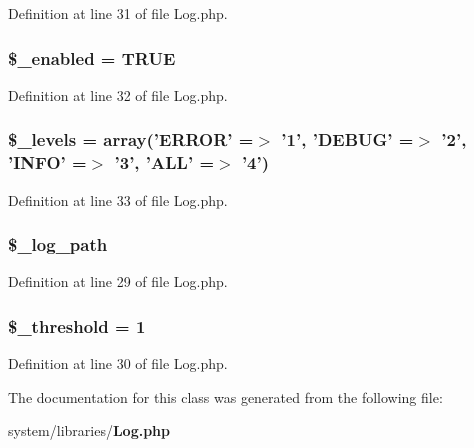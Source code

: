 Definition at line 31 of file Log.\-php.

\subsubsection[{\$\-\_\-enabled}]{\setlength{\rightskip}{0pt plus 5cm}\$\-\_\-enabled = T\-R\-U\-E\hspace{0.3cm}{\ttfamily [protected]}}\label{class_c_i___log_af8233d47e8ad3e624ba168154d2f383d}


Definition at line 32 of file Log.\-php.

\subsubsection[{\$\-\_\-levels}]{\setlength{\rightskip}{0pt plus 5cm}\$\-\_\-levels = array('E\-R\-R\-O\-R' =$>$ '1', 'D\-E\-B\-U\-G' =$>$ '2', 'I\-N\-F\-O' =$>$ '3', 'A\-L\-L' =$>$ '4')\hspace{0.3cm}{\ttfamily [protected]}}\label{class_c_i___log_aeb1c4747136537731b6cfed6f1e64941}


Definition at line 33 of file Log.\-php.

\subsubsection[{\$\-\_\-log\-\_\-path}]{\setlength{\rightskip}{0pt plus 5cm}\$\-\_\-log\-\_\-path\hspace{0.3cm}{\ttfamily [protected]}}\label{class_c_i___log_a3eaf9e92941ee6be33bc972ab76b4caf}


Definition at line 29 of file Log.\-php.

\subsubsection[{\$\-\_\-threshold}]{\setlength{\rightskip}{0pt plus 5cm}\$\-\_\-threshold = 1\hspace{0.3cm}{\ttfamily [protected]}}\label{class_c_i___log_a0fc9914bdaf300fa9a1745201204e73f}


Definition at line 30 of file Log.\-php.



The documentation for this class was generated from the following file\-:\begin{DoxyCompactItemize}
\item 
system/libraries/{\bf Log.\-php}\end{DoxyCompactItemize}
